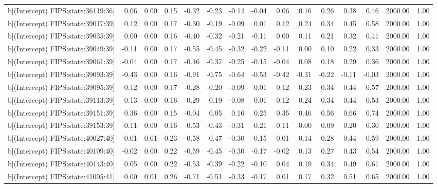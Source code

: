 \begin{table}[ht]
\begin{tabular}{rrrrrrrrrrrrrrr}
  b[(Intercept) FIPS:state:36119:36] & 0.06 & 0.00 & 0.15 & -0.32 & -0.23 & -0.14 & -0.04 & 0.06 & 0.16 & 0.26 & 0.38 & 0.46 & 2000.00 & 1.00 \\ 
  b[(Intercept) FIPS:state:39017:39] & 0.12 & 0.00 & 0.17 & -0.30 & -0.19 & -0.09 & 0.01 & 0.12 & 0.24 & 0.34 & 0.45 & 0.58 & 2000.00 & 1.00 \\ 
  b[(Intercept) FIPS:state:39035:39] & 0.00 & 0.00 & 0.16 & -0.40 & -0.32 & -0.21 & -0.11 & 0.00 & 0.11 & 0.21 & 0.32 & 0.41 & 2000.00 & 1.00 \\ 
  b[(Intercept) FIPS:state:39049:39] & -0.11 & 0.00 & 0.17 & -0.55 & -0.45 & -0.32 & -0.22 & -0.11 & 0.00 & 0.10 & 0.22 & 0.33 & 2000.00 & 1.00 \\ 
  b[(Intercept) FIPS:state:39061:39] & -0.04 & 0.00 & 0.17 & -0.46 & -0.37 & -0.25 & -0.15 & -0.04 & 0.08 & 0.18 & 0.29 & 0.36 & 2000.00 & 1.00 \\ 
  b[(Intercept) FIPS:state:39093:39] & -0.43 & 0.00 & 0.16 & -0.91 & -0.75 & -0.64 & -0.53 & -0.42 & -0.31 & -0.22 & -0.11 & -0.03 & 2000.00 & 1.00 \\ 
  b[(Intercept) FIPS:state:39095:39] & 0.12 & 0.00 & 0.17 & -0.28 & -0.20 & -0.09 & 0.01 & 0.12 & 0.23 & 0.34 & 0.44 & 0.57 & 2000.00 & 1.00 \\ 
  b[(Intercept) FIPS:state:39113:39] & 0.13 & 0.00 & 0.16 & -0.29 & -0.19 & -0.08 & 0.01 & 0.12 & 0.24 & 0.34 & 0.44 & 0.53 & 2000.00 & 1.00 \\ 
  b[(Intercept) FIPS:state:39151:39] & 0.36 & 0.00 & 0.15 & -0.04 & 0.05 & 0.16 & 0.25 & 0.35 & 0.46 & 0.56 & 0.66 & 0.74 & 2000.00 & 1.00 \\ 
  b[(Intercept) FIPS:state:39153:39] & -0.11 & 0.00 & 0.16 & -0.53 & -0.43 & -0.31 & -0.21 & -0.11 & -0.00 & 0.09 & 0.20 & 0.30 & 2000.00 & 1.00 \\ 
  b[(Intercept) FIPS:state:40027:40] & -0.01 & 0.01 & 0.23 & -0.58 & -0.47 & -0.30 & -0.15 & -0.01 & 0.14 & 0.28 & 0.44 & 0.59 & 2000.00 & 1.00 \\ 
  b[(Intercept) FIPS:state:40109:40] & -0.02 & 0.00 & 0.22 & -0.59 & -0.45 & -0.30 & -0.17 & -0.02 & 0.13 & 0.27 & 0.43 & 0.54 & 2000.00 & 1.00 \\ 
  b[(Intercept) FIPS:state:40143:40] & 0.05 & 0.00 & 0.22 & -0.53 & -0.39 & -0.22 & -0.10 & 0.04 & 0.19 & 0.34 & 0.49 & 0.61 & 2000.00 & 1.00 \\ 
  b[(Intercept) FIPS:state:41005:41] & 0.00 & 0.01 & 0.26 & -0.71 & -0.51 & -0.33 & -0.17 & 0.01 & 0.17 & 0.32 & 0.51 & 0.65 & 2000.00 & 1.00 \\ 

\end{tabular}
\end{table}
